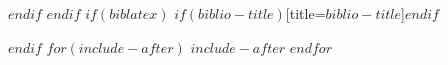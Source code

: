 \documentclass{article}
\begin{document}
$endif$
$endif$
$if(biblatex)$
\printbibliography$if(biblio-title)$[title=$biblio-title$]$endif$

$endif$
$for(include-after)$
$include-after$
\pagebreak
$endfor$

\pagestyle{empty}
\begin{titlepage}
  \BgThispage
  \null
\end{titlepage}
\end{document}
